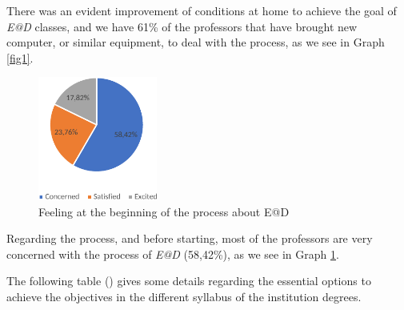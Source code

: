 \documentclass{textolivre}
\begin{document}
There was an evident improvement of conditions at home to achieve the goal of \emph{E@D} classes, and we have 61\% of the professors that have brought new computer, or similar equipment, to deal with the process, as we see in Graph \ref{fig1}.

\begin{figure}[htbp]
 \centering
 \includegraphics[width=0.35\textwidth]{Fig_002.pdf}
 \caption{Feeling at the beginning of the process about E@D}
 \label{fig2}
\end{figure}

Regarding the process, and before starting, most of the professors are very concerned with the process of \emph{E@D} (58,42\%), as we see in Graph \ref{fig2}. 

The following table () gives some details regarding the essential options to achieve the objectives in the different syllabus of the institution degrees.
\end{document}

